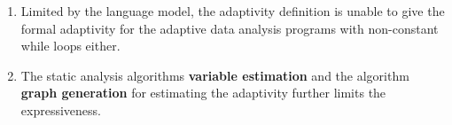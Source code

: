 {\begin{itemize}
\begin{enumerate}
    \[
    {\assign{x}{20}};
    \assign{y}{100};
    \ewhile (x < y) \edo 
    \{
    \assign{x}{x + 1};
    \assign{y}{y - 2};
    \}
    \] 
    Because the number of iterations cannot be evaluated to a nature number in advance of entering this loop, 
    is only
    able to be decided during executing this while loop body.
    \item Limited by the language model, the adaptivity definition is unable to give
    the formal adaptivity for the adaptive data analysis programs
    with non-constant
    while loops either.
    \item The static analysis algorithms \textbf{variable estimation} and the algorithm \textbf{graph generation}
    for estimating the adaptivity further limits the expressiveness.

\end{enumerate}
\end{itemize}}
